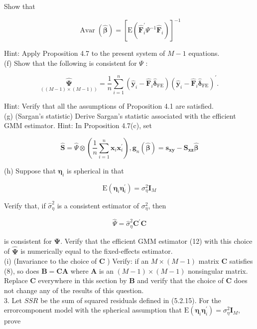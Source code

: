 \documentclass[10pt]{article}
\begin{document}
Show that


\begin{equation*}
\operatorname{Avar}(\widehat{\boldsymbol{\beta}})=\left[\mathrm{E}\left(\widehat{\mathbf{F}}_{i}^{\prime} \Psi^{-1} \widehat{\mathbf{F}}_{i}\right)\right]^{-1} \tag{13}
\end{equation*}


Hint: Apply Proposition 4.7 to the present system of $M-1$ equations.\\
(f) Show that the following is consistent for $\Psi$ :


\begin{equation*}
\underset{((M-1) \times(M-1))}{\widehat{\mathbf{\Psi}}}=\frac{1}{n} \sum_{i=1}^{n}\left(\hat{\mathbf{y}}_{i}-\widehat{\mathbf{F}}_{i} \hat{\boldsymbol{\delta}}_{\mathrm{FE}}\right)\left(\hat{\mathbf{y}}_{i}-\widehat{\mathbf{F}}_{i} \hat{\boldsymbol{\delta}}_{\mathrm{FE}}\right)^{\prime} . \tag{14}
\end{equation*}


Hint: Verify that all the assumptions of Proposition 4.1 are satisfied.\\
(g) (Sargan's statistic) Derive Sargan's statistic associated with the efficient GMM estimator. Hint: In Proposition 4.7(c), set

$$
\widehat{\mathbf{S}}=\widehat{\Psi} \otimes\left(\frac{1}{n} \sum_{i=1}^{n} \mathbf{x}_{i} \mathbf{x}_{i}^{\prime}\right), \mathbf{g}_{n}(\widehat{\boldsymbol{\beta}})=\mathbf{s}_{\mathbf{x y}}-\mathbf{S}_{\mathbf{x z}} \widehat{\boldsymbol{\beta}}
$$

(h) Suppose that $\boldsymbol{\eta}_{i}$ is spherical in that


\begin{equation*}
\mathrm{E}\left(\boldsymbol{\eta}_{i} \boldsymbol{\eta}_{i}^{\prime}\right)=\sigma_{\eta}^{2} \mathbf{I}_{M} \tag{15}
\end{equation*}


Verify that, if $\hat{\sigma}_{\eta}^{2}$ is a consistent estimator of $\sigma_{\eta}^{2}$, then


\begin{equation*}
\widehat{\Psi}=\hat{\sigma}_{\eta}^{2} \mathbf{C}^{\prime} \mathbf{C} \tag{16}
\end{equation*}


is consistent for $\boldsymbol{\Psi}$. Verify that the efficient GMM estimator (12) with this choice of $\widehat{\boldsymbol{\Psi}}$ is numerically equal to the fixed-effects estimator.\\
(i) (Invariance to the choice of $\mathbf{C}$ ) Verify: if an $M \times(M-1)$ matrix $\mathbf{C}$ satisfies (8), so does $\mathbf{B}=\mathbf{C} \mathbf{A}$ where $\mathbf{A}$ is an $(M-1) \times(M-1)$ nonsingular matrix. Replace $\mathbf{C}$ everywhere in this section by $\mathbf{B}$ and verify that the choice of $\mathbf{C}$ does not change any of the results of this question.\\
3. Let $S S R$ be the sum of squared residuals defined in (5.2.15). For the errorcomponent model with the spherical assumption that $\mathrm{E}\left(\boldsymbol{\eta}_{i} \boldsymbol{\eta}_{i}^{\prime}\right)=\sigma_{\eta}^{2} \mathbf{I}_{M}$, prove
\end{document}
